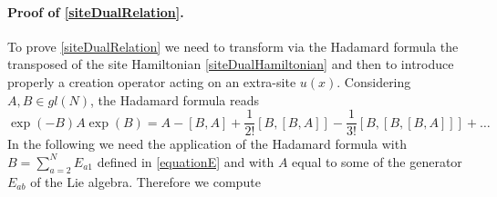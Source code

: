 \documentclass[11pt]{article}
\numberwithin{equation}{section}
\numberwithin{equation}{subsection}
\begin{document}
 \paragraph{Proof of \eqref{siteDualRelation}.} To prove \eqref{siteDualRelation} we need to transform via the Hadamard formula the transposed of the site Hamiltonian \eqref{siteDualHamiltonian} and then to  introduce properly a creation operator acting on an extra-site $u(x)$. %
 Considering $A,B\in gl(N)$, the Hadamard formula reads 
 \begin{equation}\label{HadamardFormula}
     \exp{(-B)}A\exp{(B)}=A-\left[B,A\right]+\frac{1}{2!}\left[B,\left[B,A\right]\right]-\frac{1}{3!}\left[B,\left[B,\left[B,A\right]\right]\right]+\ldots
 \end{equation}
In the following we need the application of the Hadamard formula with $B=\sum_{a=2}^{N}E_{a1}$ defined in \eqref{equationE} and with $A$ equal to some of the generator $E_{ab}$ of the Lie algebra. Therefore we compute 
\end{document}
